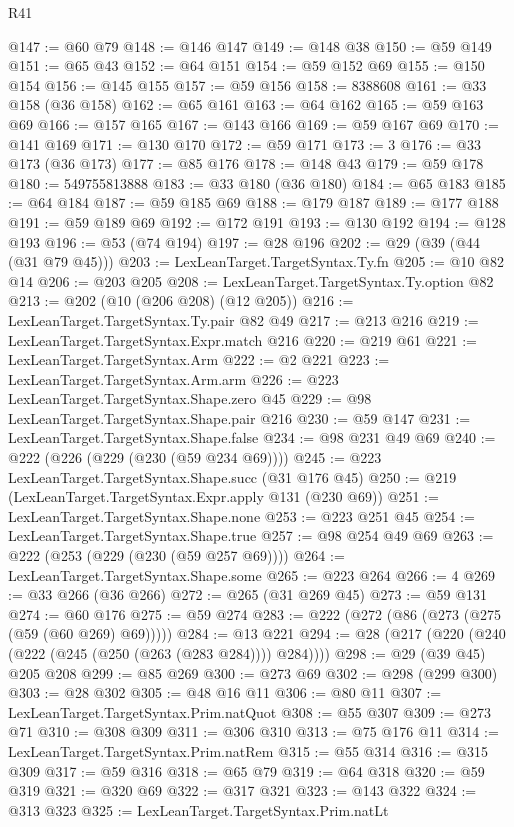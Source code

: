 \begin{lexlean}{R41}
\begin{coremodule}
@147 := @60 @79
@148 := @146 @147
@149 := @148 @38
@150 := @59 @149
@151 := @65 @43
@152 := @64 @151
@154 := @59 @152 @69
@155 := @150 @154
@156 := @145 @155
@157 := @59 @156
@158 := 8388608
@161 := @33 @158 (@36 @158)
@162 := @65 @161
@163 := @64 @162
@165 := @59 @163 @69
@166 := @157 @165
@167 := @143 @166
@169 := @59 @167 @69
@170 := @141 @169
@171 := @130 @170
@172 := @59 @171
@173 := 3
@176 := @33 @173 (@36 @173)
@177 := @85 @176
@178 := @148 @43
@179 := @59 @178
@180 := 549755813888
@183 := @33 @180 (@36 @180)
@184 := @65 @183
@185 := @64 @184
@187 := @59 @185 @69
@188 := @179 @187
@189 := @177 @188
@191 := @59 @189 @69
@192 := @172 @191
@193 := @130 @192
@194 := @128 @193
@196 := @53 (@74 @194)
@197 := @28 @196
@202 := @29 (@39 (@44 (@31 @79 @45)))
@203 := LexLeanTarget.TargetSyntax.Ty.fn
@205 := @10 @82 @14
@206 := @203 @205
@208 := LexLeanTarget.TargetSyntax.Ty.option @82
@213 := @202 (@10 (@206 @208) (@12 @205))
@216 := LexLeanTarget.TargetSyntax.Ty.pair @82 @49
@217 := @213 @216
@219 := LexLeanTarget.TargetSyntax.Expr.match @216
@220 := @219 @61
@221 := LexLeanTarget.TargetSyntax.Arm
@222 := @2 @221
@223 := LexLeanTarget.TargetSyntax.Arm.arm
@226 := @223 LexLeanTarget.TargetSyntax.Shape.zero @45
@229 := @98 LexLeanTarget.TargetSyntax.Shape.pair @216
@230 := @59 @147
@231 := LexLeanTarget.TargetSyntax.Shape.false
@234 := @98 @231 @49 @69
@240 := @222 (@226 (@229 (@230 (@59 @234 @69))))
@245 := @223 LexLeanTarget.TargetSyntax.Shape.succ (@31 @176 @45)
@250 := @219 (LexLeanTarget.TargetSyntax.Expr.apply @131 (@230 @69))
@251 := LexLeanTarget.TargetSyntax.Shape.none
@253 := @223 @251 @45
@254 := LexLeanTarget.TargetSyntax.Shape.true
@257 := @98 @254 @49 @69
@263 := @222 (@253 (@229 (@230 (@59 @257 @69))))
@264 := LexLeanTarget.TargetSyntax.Shape.some
@265 := @223 @264
@266 := 4
@269 := @33 @266 (@36 @266)
@272 := @265 (@31 @269 @45)
@273 := @59 @131
@274 := @60 @176
@275 := @59 @274
@283 := @222 (@272 (@86 (@273 (@275 (@59 (@60 @269) @69)))))
@284 := @13 @221
@294 := @28 (@217 (@220 (@240 (@222 (@245 (@250 (@263 (@283 @284)))) @284))))
@298 := @29 (@39 @45) @205 @208
@299 := @85 @269
@300 := @273 @69
@302 := @298 (@299 @300)
@303 := @28 @302
@305 := @48 @16 @11
@306 := @80 @11
@307 := LexLeanTarget.TargetSyntax.Prim.natQuot
@308 := @55 @307
@309 := @273 @71
@310 := @308 @309
@311 := @306 @310
@313 := @75 @176 @11
@314 := LexLeanTarget.TargetSyntax.Prim.natRem
@315 := @55 @314
@316 := @315 @309
@317 := @59 @316
@318 := @65 @79
@319 := @64 @318
@320 := @59 @319
@321 := @320 @69
@322 := @317 @321
@323 := @143 @322
@324 := @313 @323
@325 := LexLeanTarget.TargetSyntax.Prim.natLt

\end{coremodule}
\end{lexlean}
